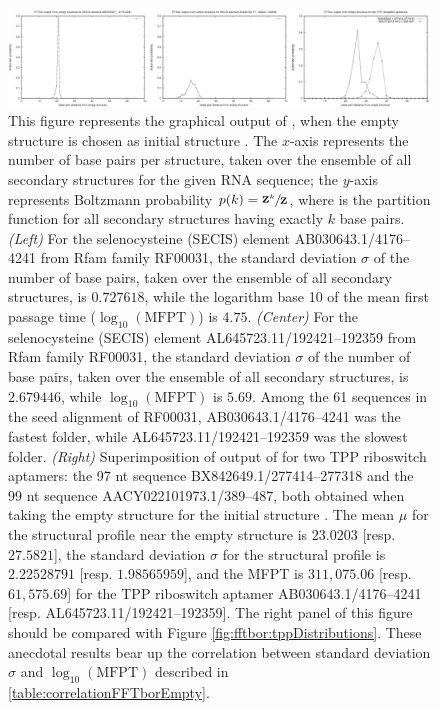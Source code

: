 \begin{figure}[!ht]
\centering
\includegraphics[width=.9\textwidth]{Figures/FFTbor/correlationFFTborEmpty.pdf}
\caption{This figure represents the
graphical output of \fftbor, when the empty structure is chosen as
initial structure \strSt.
The $x$-axis represents the number of base pairs per structure,
taken over the ensemble of all secondary structures for the given RNA
sequence; the $y$-axis represents Boltzmann probability
$p(k) = \sfrac{{\bf Z}^{k}_{}}{{\bf Z}^{}_{}}$,
where \fullZ is the partition function for all secondary structures
having exactly $k$ base pairs.
{\em (Left)}
For the selenocysteine (SECIS) element AB030643.1/4176--4241 from Rfam family
RF00031, the standard deviation $\sigma$ of the number of base pairs,
taken over the ensemble of all secondary structures, is
$0.727618$, while the logarithm base 10 of the mean first passage time ($\log_{10}(\text{MFPT})$)
is $4.75$.
{\em (Center)}
For the selenocysteine (SECIS) element
AL645723.11/192421--192359 from Rfam family
RF00031, the standard deviation $\sigma$ of the number of base pairs,
taken over the ensemble of all secondary structures, is
$2.679446$, while $\log_{10}(\text{MFPT})$ is $5.69$.
Among the 61 sequences in the seed alignment of RF00031,
AB030643.1/4176--4241 was the fastest folder, while
AL645723.11/192421--192359 was the slowest folder.
{\em (Right)}
Superimposition of output of \fftbor for two TPP riboswitch aptamers: the
97 nt sequence BX842649.1/277414--277318 and the
99 nt sequence AACY022101973.1/389--487, both obtained when
taking the empty structure for the initial structure \strSt.
The mean $\mu$ for the \fftbor structural profile near the empty
structure is $23.0203$  [resp. $27.5821$], the
standard deviation $\sigma$ for the \fftbor structural profile
is $2.22528791$  [resp. $1.98565959$], and the \kinfold MFPT is
$311,075.06$ [resp. $61,575.69$] for the TPP riboswitch aptamer
AB030643.1/4176--4241 [resp.  AL645723.11/192421--192359].
The right panel of this figure should be compared with Figure
\ref{fig:fftbor:tppDistributions}.
These anecdotal results bear up the correlation between standard deviation
$\sigma$ and $\log_{10}(\text{MFPT})$ described in \ref{table:correlationFFTborEmpty}.
}
\label{fig:fftbor:correlationFFTborEmpty}
\end{figure}


